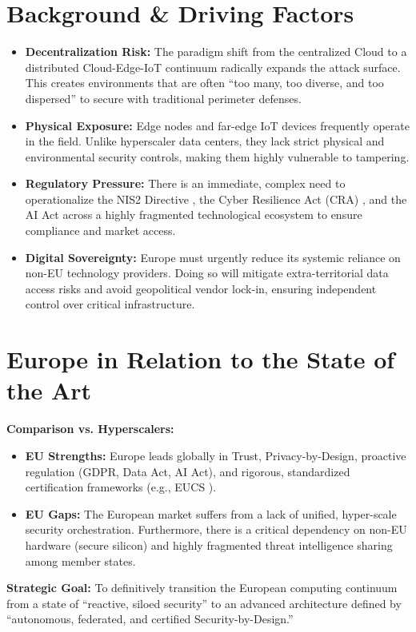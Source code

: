 \documentclass[12pt,a4paper]{article}
\begin{document}
\section{Background \& Driving Factors}
\begin{itemize}
    \item \textbf{Decentralization Risk:} The paradigm shift from the centralized Cloud to a distributed Cloud-Edge-IoT continuum radically expands the attack surface. This creates environments that are often ``too many, too diverse, and too dispersed'' to secure with traditional perimeter defenses.
    \item \textbf{Physical Exposure:} Edge nodes and far-edge IoT devices frequently operate in the field. Unlike hyperscaler data centers, they lack strict physical and environmental security controls, making them highly vulnerable to tampering.
    \item \textbf{Regulatory Pressure:} There is an immediate, complex need to operationalize the NIS2 Directive \cite{nis2}, the Cyber Resilience Act (CRA) \cite{cra}, and the AI Act \cite{aiact} across a highly fragmented technological ecosystem to ensure compliance and market access.
    \item \textbf{Digital Sovereignty:} Europe must urgently reduce its systemic reliance on non-EU technology providers. Doing so will mitigate extra-territorial data access risks and avoid geopolitical vendor lock-in, ensuring independent control over critical infrastructure.
\end{itemize}

\section{Europe in Relation to the State of the Art}
\textbf{Comparison vs. Hyperscalers:}
\begin{itemize}
    \item \textbf{EU Strengths:} Europe leads globally in Trust, Privacy-by-Design, proactive regulation (GDPR, Data Act, AI Act), and rigorous, standardized certification frameworks (e.g., EUCS \cite{eucs}).
    \item \textbf{EU Gaps:} The European market suffers from a lack of unified, hyper-scale security orchestration. Furthermore, there is a critical dependency on non-EU hardware (secure silicon) and highly fragmented threat intelligence sharing among member states.
\end{itemize}
\textbf{Strategic Goal:} To definitively transition the European computing continuum from a state of ``reactive, siloed security'' to an advanced architecture defined by ``autonomous, federated, and certified Security-by-Design.''
\end{document}

